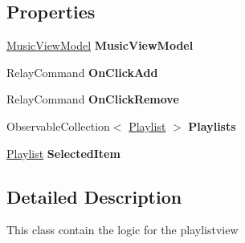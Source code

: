 \subsection*{Properties}
\begin{DoxyCompactItemize}
\item 
\mbox{\label{class_presentation_1_1_view_model_1_1_playlist_view_model_a3b228cd7d10f6082d7695b8227a0ef72}} 
\hyperlink{class_presentation_1_1_view_model_1_1_music_view_model}{Music\+View\+Model} {\bfseries Music\+View\+Model}
\item 
\mbox{\label{class_presentation_1_1_view_model_1_1_playlist_view_model_ae8f4ccb5efdebeb604c94faf9c098fec}} 
Relay\+Command {\bfseries On\+Click\+Add}
\item 
\mbox{\label{class_presentation_1_1_view_model_1_1_playlist_view_model_a617dbf3a65c5e57d113bb97e97c133a4}} 
Relay\+Command {\bfseries On\+Click\+Remove}
\item 
\mbox{\label{class_presentation_1_1_view_model_1_1_playlist_view_model_a8753d157677e9d8bf913bb50429037ba}} 
Observable\+Collection$<$ \hyperlink{class_d_t_o_1_1_entity_1_1_playlist}{Playlist} $>$ {\bfseries Playlists}
\item 
\mbox{\label{class_presentation_1_1_view_model_1_1_playlist_view_model_a5552b61d284f35b3d74d7f3a6a79c4e3}} 
\hyperlink{class_d_t_o_1_1_entity_1_1_playlist}{Playlist} {\bfseries Selected\+Item}
\end{DoxyCompactItemize}


\subsection{Detailed Description}
This class contain the logic for the playlistview 



